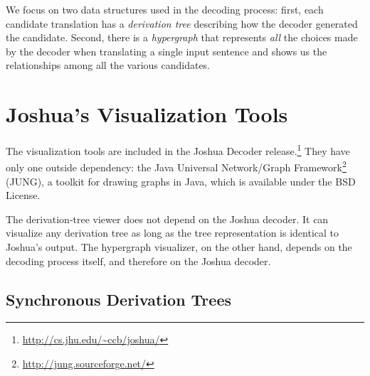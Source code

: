 \documentclass[nologo]{pbml}
\begin{document}
We focus on two data structures
used in the decoding process: first, each candidate translation has a {\em
derivation tree} describing how the decoder generated the candidate. Second,
there is a {\em hypergraph} that represents {\em all} the choices made by the
decoder when translating a single input sentence and shows us the relationships among all the various candidates.


\section{Joshua's Visualization Tools}





The visualization tools are included in the Joshua Decoder release.\footnote{\url{http://cs.jhu.edu/~ccb/joshua/}} They have
only one outside dependency: the Java Universal Network/Graph Framework\footnote{\url{http://jung.sourceforge.net/}} (JUNG), a toolkit for drawing graphs in Java,
which is available under the BSD License.

The derivation-tree viewer does not depend on the Joshua decoder. It can
visualize any derivation tree as long as the tree representation is identical
to Joshua's output. The hypergraph visualizer, on the other hand, depends
on the decoding process itself, and therefore on the Joshua decoder.

\subsection{Synchronous Derivation Trees}
\end{document}
